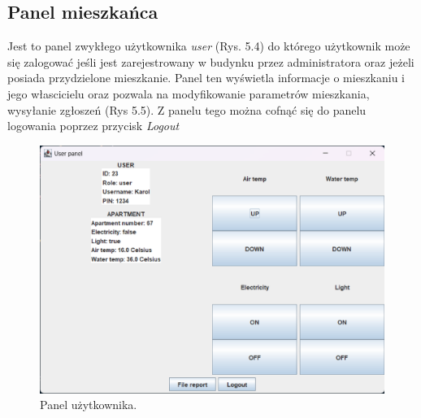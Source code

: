 \subsection{Panel mieszkańca}
Jest to panel zwykłego użytkownika \textit{user} (Rys. 5.4) do którego użytkownik może się zalogować jeśli jest zarejestrowany w budynku przez 
administratora oraz jeżeli posiada przydzielone mieszkanie. Panel ten wyświetla informacje o mieszkaniu i jego włascicielu oraz pozwala na modyfikowanie parametrów mieszkania, wysyłanie zgłoszeń (Rys 5.5).
Z panelu tego można cofnąć się do panelu logowania poprzez przycisk \textit{Logout}
\begin{figure}[H]
    \centering
    \includegraphics[width=\textwidth,height=0.5\textheight,keepaspectratio]{figures/app-images/user-panel.eps}
    \caption{Panel użytkownika.\label{fig9}}
\end{figure}

\newpage
